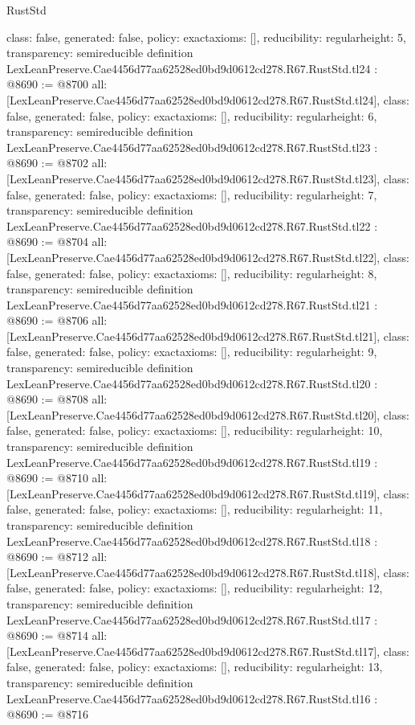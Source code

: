 \begin{lexlean}{RustStd}
\begin{coremodule}
{  class: false,
  generated: false,
  policy: exact{axioms: []},
  reducibility: regular{height: 5},
  transparency: semireducible
}
definition LexLeanPreserve.Cae4456d77aa62528ed0bd9d0612cd278.R67.RustStd.tl24 : @8690 := @8700 {
  all: [LexLeanPreserve.Cae4456d77aa62528ed0bd9d0612cd278.R67.RustStd.tl24],
  class: false,
  generated: false,
  policy: exact{axioms: []},
  reducibility: regular{height: 6},
  transparency: semireducible
}
definition LexLeanPreserve.Cae4456d77aa62528ed0bd9d0612cd278.R67.RustStd.tl23 : @8690 := @8702 {
  all: [LexLeanPreserve.Cae4456d77aa62528ed0bd9d0612cd278.R67.RustStd.tl23],
  class: false,
  generated: false,
  policy: exact{axioms: []},
  reducibility: regular{height: 7},
  transparency: semireducible
}
definition LexLeanPreserve.Cae4456d77aa62528ed0bd9d0612cd278.R67.RustStd.tl22 : @8690 := @8704 {
  all: [LexLeanPreserve.Cae4456d77aa62528ed0bd9d0612cd278.R67.RustStd.tl22],
  class: false,
  generated: false,
  policy: exact{axioms: []},
  reducibility: regular{height: 8},
  transparency: semireducible
}
definition LexLeanPreserve.Cae4456d77aa62528ed0bd9d0612cd278.R67.RustStd.tl21 : @8690 := @8706 {
  all: [LexLeanPreserve.Cae4456d77aa62528ed0bd9d0612cd278.R67.RustStd.tl21],
  class: false,
  generated: false,
  policy: exact{axioms: []},
  reducibility: regular{height: 9},
  transparency: semireducible
}
definition LexLeanPreserve.Cae4456d77aa62528ed0bd9d0612cd278.R67.RustStd.tl20 : @8690 := @8708 {
  all: [LexLeanPreserve.Cae4456d77aa62528ed0bd9d0612cd278.R67.RustStd.tl20],
  class: false,
  generated: false,
  policy: exact{axioms: []},
  reducibility: regular{height: 10},
  transparency: semireducible
}
definition LexLeanPreserve.Cae4456d77aa62528ed0bd9d0612cd278.R67.RustStd.tl19 : @8690 := @8710 {
  all: [LexLeanPreserve.Cae4456d77aa62528ed0bd9d0612cd278.R67.RustStd.tl19],
  class: false,
  generated: false,
  policy: exact{axioms: []},
  reducibility: regular{height: 11},
  transparency: semireducible
}
definition LexLeanPreserve.Cae4456d77aa62528ed0bd9d0612cd278.R67.RustStd.tl18 : @8690 := @8712 {
  all: [LexLeanPreserve.Cae4456d77aa62528ed0bd9d0612cd278.R67.RustStd.tl18],
  class: false,
  generated: false,
  policy: exact{axioms: []},
  reducibility: regular{height: 12},
  transparency: semireducible
}
definition LexLeanPreserve.Cae4456d77aa62528ed0bd9d0612cd278.R67.RustStd.tl17 : @8690 := @8714 {
  all: [LexLeanPreserve.Cae4456d77aa62528ed0bd9d0612cd278.R67.RustStd.tl17],
  class: false,
  generated: false,
  policy: exact{axioms: []},
  reducibility: regular{height: 13},
  transparency: semireducible
}
definition LexLeanPreserve.Cae4456d77aa62528ed0bd9d0612cd278.R67.RustStd.tl16 : @8690 := @8716 {
}
\end{coremodule}
\end{lexlean}
